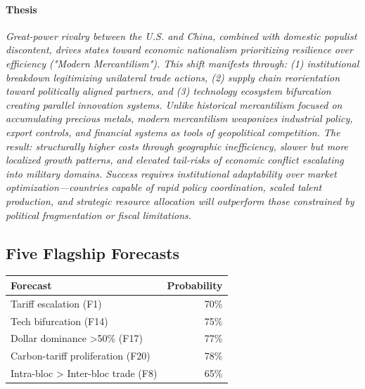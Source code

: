 \documentclass{article}
\begin{document}
\begin{multicols}{2}

\paragraph{Thesis} \textit{Great-power rivalry between the U.S. and China, combined with domestic populist discontent, drives states toward economic nationalism prioritizing resilience over efficiency ("Modern Mercantilism"). This shift manifests through: (1) institutional breakdown legitimizing unilateral trade actions, (2) supply chain reorientation toward politically aligned partners, and (3) technology ecosystem bifurcation creating parallel innovation systems. Unlike historical mercantilism focused on accumulating precious metals, modern mercantilism weaponizes industrial policy, export controls, and financial systems as tools of geopolitical competition. The result: structurally higher costs through geographic inefficiency, slower but more localized growth patterns, and elevated tail-risks of economic conflict escalating into military domains. Success requires institutional adaptability over market optimization—countries capable of rapid policy coordination, scaled talent production, and strategic resource allocation will outperform those constrained by political fragmentation or fiscal limitations.}

\subsection*{Five Flagship Forecasts}
\vspace{-5pt}
\small
\begin{center}
\begin{tabular}{lr}
\toprule
\textbf{Forecast} & \textbf{Probability} \\
\midrule
Tariff escalation (F1) & 70\% \\
Tech bifurcation (F14) & 75\% \\
Dollar dominance >50\% (F17) & 77\% \\
Carbon-tariff proliferation (F20) & 78\% \\
Intra-bloc > Inter-bloc trade (F8) & 65\% \\
\bottomrule
\end{tabular}
\end{center}

\columnbreak


\end{multicols}
\end{document}
